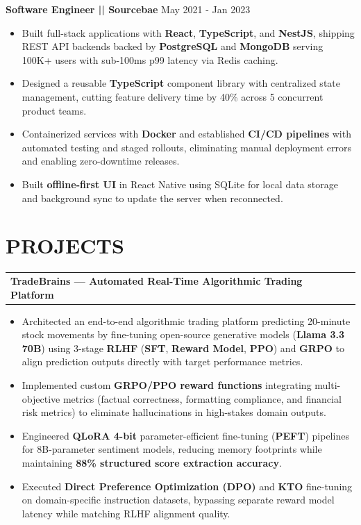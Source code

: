 \vspace{5pt}
\textbf{Software Engineer || Sourcebae}
\hfill May 2021 - Jan 2023
\begin{itemize}
\vspace{2pt}
\item {Built full-stack applications with \textbf{React}, \textbf{TypeScript}, and \textbf{NestJS}, shipping REST API backends backed by \textbf{PostgreSQL} and \textbf{MongoDB} serving 100K+ users with sub-100ms p99 latency via Redis caching.}
\item {Designed a reusable \textbf{TypeScript} component library with centralized state management, cutting feature delivery time by 40\% across 5 concurrent product teams.}
\item {Containerized services with \textbf{Docker} and established \textbf{CI/CD pipelines} with automated testing and staged rollouts, eliminating manual deployment errors and enabling zero-downtime releases.}
\item {Built \textbf{offline-first UI} in React Native using SQLite for local data storage and background sync to update the server when reconnected.}

\end{itemize}

\sectionline
\section*{PROJECTS}
\begin{tabularx}{\textwidth}{@{} X >{\raggedleft\arraybackslash}p{8cm} @{}}
\textbf{TradeBrains — Automated Real-Time Algorithmic Trading Platform}
\end{tabularx}
\begin{itemize}
\vspace{4pt}
\item {Architected an end-to-end algorithmic trading platform predicting 20-minute stock movements by fine-tuning open-source generative models (\textbf{Llama 3.3 70B}) using 3-stage \textbf{RLHF} (\textbf{SFT}, \textbf{Reward Model}, \textbf{PPO}) and \textbf{GRPO} to align prediction outputs directly with target performance metrics.}
\item {Implemented custom \textbf{GRPO/PPO reward functions} integrating multi-objective metrics (factual correctness, formatting compliance, and financial risk metrics) to eliminate hallucinations in high-stakes domain outputs.}
\item {Engineered \textbf{QLoRA 4-bit} parameter-efficient fine-tuning (\textbf{PEFT}) pipelines for 8B-parameter sentiment models, reducing memory footprints while maintaining \textbf{88\% structured score extraction accuracy}.}
\item {Executed \textbf{Direct Preference Optimization (DPO)} and \textbf{KTO} fine-tuning on domain-specific instruction datasets, bypassing separate reward model latency while matching RLHF alignment quality.}
\end{itemize}

